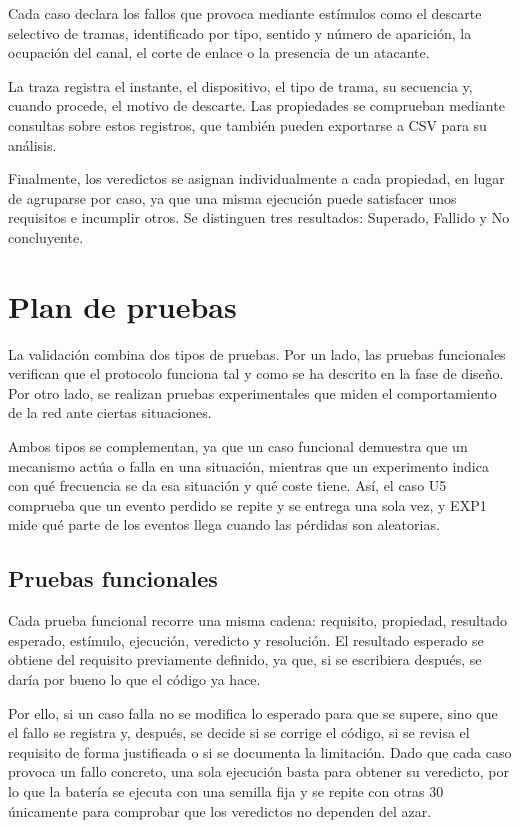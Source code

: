 Cada caso declara los fallos que provoca mediante estímulos como el descarte selectivo de tramas, identificado por tipo, sentido y número de aparición, la ocupación del canal, el corte de enlace o la presencia de un atacante.

La traza registra el instante, el dispositivo, el tipo de trama, su secuencia y, cuando procede, el motivo de descarte. Las propiedades se comprueban mediante consultas sobre estos registros, que también pueden exportarse a CSV para su análisis.

Finalmente, los veredictos se asignan individualmente a cada propiedad, en lugar de agruparse por caso, ya que una misma ejecución puede satisfacer unos requisitos e incumplir otros. Se distinguen tres resultados: Superado, Fallido y No concluyente.

\section{Plan de pruebas}\label{sec:plan-pruebas}

La validación combina dos tipos de pruebas. Por un lado, las pruebas funcionales verifican que el protocolo funciona tal y como se ha descrito en la fase de diseño. Por otro lado, se realizan pruebas experimentales que miden el comportamiento de la red ante ciertas situaciones.

Ambos tipos se complementan, ya que un caso funcional demuestra que un mecanismo actúa o falla en una situación, mientras que un experimento indica con qué frecuencia se da esa situación y qué coste tiene. Así, el caso U5 comprueba que un evento perdido se repite y se entrega una sola vez, y EXP1 mide qué parte de los eventos llega cuando las pérdidas son aleatorias.

\subsection{Pruebas funcionales}\label{sec:plan-funcional}

Cada prueba funcional recorre una misma cadena: requisito, propiedad, resultado esperado, estímulo, ejecución, veredicto y resolución. El resultado esperado se obtiene del requisito previamente definido, ya que, si se escribiera después, se daría por bueno lo que el código ya hace. 

Por ello, si un caso falla no se modifica lo esperado para que se supere, sino que el fallo se registra y, después, se decide si se corrige el código, si se revisa el requisito de forma justificada o si se documenta la limitación. Dado que cada caso provoca un fallo concreto, una sola ejecución basta para obtener su veredicto, por lo que la batería se ejecuta con una semilla fija y se repite con otras 30 únicamente para comprobar que los veredictos no dependen del azar.

